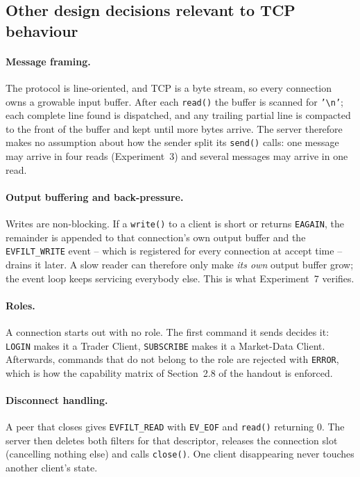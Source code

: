 \documentclass[11pt,a4paper]{article}
\newcommand{\nlch}{\texttt{'\textbackslash n'}}
\begin{document}
\subsection{Other design decisions relevant to TCP behaviour}

\paragraph{Message framing.}  The protocol is line-oriented, and TCP is a byte stream,
so every connection owns a growable input buffer.  After each \texttt{read()} the buffer
is scanned for \nlch; each complete line found is dispatched, and any trailing
partial line is compacted to the front of the buffer and kept until more bytes arrive.
The server therefore makes no assumption about how the sender split its
\texttt{send()} calls: one message may arrive in four reads (Experiment~3) and several
messages may arrive in one read.

\paragraph{Output buffering and back-pressure.}  Writes are non-blocking.  If a
\texttt{write()} to a client is short or returns \texttt{EAGAIN}, the remainder is
appended to that connection's own output buffer and the \texttt{EVFILT\_WRITE} event --
which is registered for every connection at accept time -- drains it later.  A slow
reader can therefore only make \emph{its own} output buffer grow; the event loop keeps
servicing everybody else.  This is what Experiment~7 verifies.

\paragraph{Roles.}  A connection starts out with no role.  The first command it sends
decides it: \texttt{LOGIN} makes it a Trader Client, \texttt{SUBSCRIBE} makes it a
Market-Data Client.  Afterwards, commands that do not belong to the role are rejected
with \texttt{ERROR}, which is how the capability matrix of Section~2.8 of the handout is
enforced.

\paragraph{Disconnect handling.}  A peer that closes gives \texttt{EVFILT\_READ} with
\texttt{EV\_EOF} and \texttt{read()} returning $0$.  The server then deletes both
filters for that descriptor, releases the connection slot (cancelling nothing else) and
calls \texttt{close()}.  One client disappearing never touches another client's state.
\end{document}
